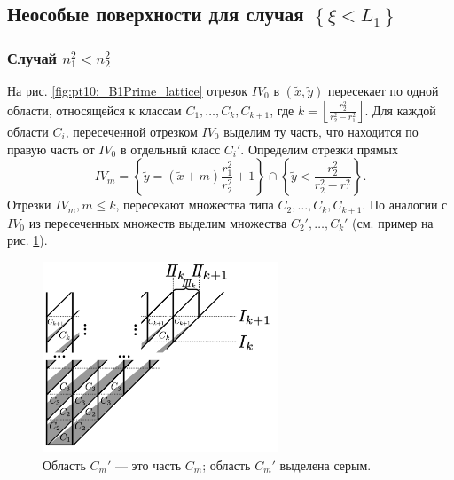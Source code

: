 \subsection{Неособые поверхности для случая $\left\{\xi < L_1\right\}$}\label{sec:ch4/sec3/subsec8}
\subsubsection{Случай $n_1^2<n_2^2$}\label{sec:ch4/sec3/subsec8/subsec1}
На рис. \ref{fig:pt10:_B1Prime_lattice} отрезок $IV_0$ в $(\widetilde{x}, \widetilde{y})$
пересекает по одной области, относящейся к классам $C_1, \ldots, C_k, C_{k+1}$, где $k = \left \lfloor \frac{r_2^2}{r_2^2 - r_1^2} \right \rfloor$. 
Для каждой области  $C_i$, пересеченной отрезком $IV_0$ выделим ту часть, что находится по правую часть от $IV_0$  в отдельный класс $C_i'$.
Определим отрезки прямых 
\begin{equation}
IV_m =  \left\{ \widetilde{y} = (\widetilde{x} + m) \frac{r_1^2}{r_2^2} + 1 \right\} \cap \left\{\widetilde{y}< \frac{r_2^2}{r_2^2-r_1^2}\right\}.
\label{eq:IVdef}
\end{equation} 
Отрезки $IV_m, m \leq k$, пересекают множества типа $C_2, \ldots, C_k, C_{k+1}$. По аналогии с $IV_0$ из пересеченных множеств выделим множества  $C_2', \ldots, C_k'$ (см. пример на рис. \ref{fig:pt10:_C_kPrime_definitions}).

\begin{figure}[!htb]
\centering
\includegraphics[width=7cm]{images/ch4/section3_circular/atoms/branching/C_kPrime_definitions.pdf}
    \caption{Область $C_m'$ --- это часть $C_m$; область $C_m'$ выделена серым.}
    \label{fig:pt10:_C_kPrime_definitions}
\end{figure}

